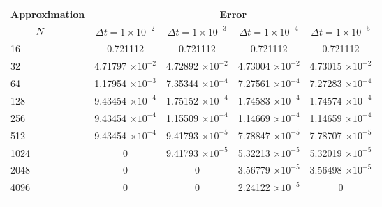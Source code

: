 \begin{frame}
\begin{table}
	\begin{tabular}{lcccc}
		\toprule
		\multicolumn{1}{c}{\textbf{Approximation}} & \multicolumn{4}{c}{\textbf{Error}} \\
		$\hspace{9mm}N$ & $\Delta t=1\times 10^{-2}$ & $\Delta t=1\times 10^{-3}$ & $\Delta t=1\times 10^{-4}$ & $\Delta t=1\times 10^{-5}$ \\
		\midrule
		\hspace{7mm} 16 & 0.721112    & 0.721112    & 0.721112    & 0.721112    \\
		\midrule
		\hspace{7mm} 32 & 4.71797 $\times 10^{-2}$   & 4.72892 $\times 10^{-2}$   & 4.73004 $\times 10^{-2}$   & 4.73015 $\times 10^{-2}$   \\
		\midrule
		\hspace{7mm} 64 & 1.17954 $\times 10^{-3}$  & 7.35344 $\times 10^{-4}$ & 7.27561 $\times 10^{-4}$ & 7.27283 $\times 10^{-4}$  \\
		\midrule
		\hspace{7mm} 128 & 9.43454 $\times 10^{-4}$ & 1.75152 $\times 10^{-4}$ & 1.74583 $\times 10^{-4}$ & 1.74574 $\times 10^{-4}$ \\
		\midrule
		\hspace{7mm} 256 & 9.43454 $\times 10^{-4}$ & 1.15509 $\times 10^{-4}$ & 1.14669 $\times 10^{-4}$ & 1.14659 $\times 10^{-4}$ \\
		\midrule
		\hspace{7mm} 512 & 9.43454 $\times 10^{-4}$ & 9.41793 $\times 10^{-5}$ & 7.78847 $\times 10^{-5}$ & 7.78707 $\times 10^{-5}$ \\
		\midrule
		\hspace{7mm} 1024 & 0           & 9.41793 $\times 10^{-5}$ & 5.32213 $\times 10^{-5}$ & 5.32019 $\times 10^{-5}$ \\
		\midrule
		\hspace{7mm} 2048 & 0           & 0           & 3.56779 $\times 10^{-5}$ & 3.56498 $\times 10^{-5}$ \\
		\midrule
		\hspace{7mm} 4096 & 0           & 0           & 2.24122 $\times 10^{-5}$ & 0           \\
		\\
		\bottomrule
	\end{tabular}
\end{table}
\end{frame}

